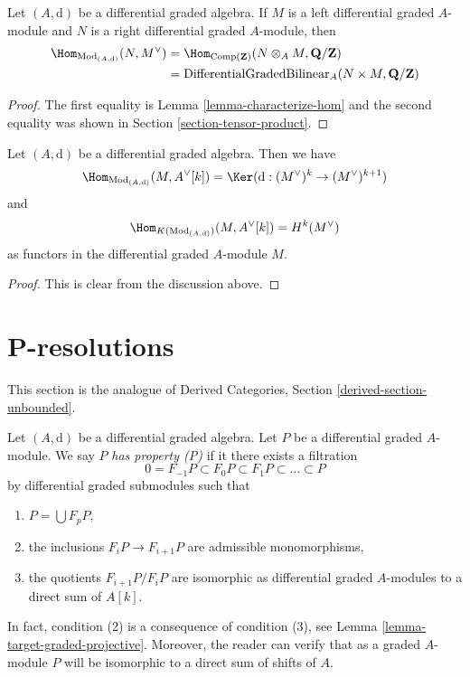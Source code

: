 \begin{lemma}
\label{lemma-map-into-dual}
Let $(A, \text{d})$ be a differential graded algebra. If
$M$ is a left differential graded $A$-module and $N$ is a
right differential graded $A$-module, then
\begin{align*}
\Hom_{\text{Mod}_{(A, \text{d})}}(N, M^\vee)
& =
\Hom_{\text{Comp}(\mathbf{Z})}(N \otimes_A M, \mathbf{Q}/\mathbf{Z}) \\
& =
\text{DifferentialGradedBilinear}_A(N \times M, \mathbf{Q}/\mathbf{Z})
\end{align*}
\end{lemma}

\begin{proof}
The first equality is Lemma \ref{lemma-characterize-hom}
and the second equality was shown in Section \ref{section-tensor-product}.
\end{proof}

\begin{lemma}
\label{lemma-hom-into-shift-dual-free}
Let $(A, \text{d})$ be a differential graded algebra. Then we have
$$
\Hom_{\text{Mod}_{(A, \text{d})}}(M, A^\vee[k]) =
\Ker(\text{d} : (M^\vee)^k \to (M^\vee)^{k + 1})
$$
and
$$
\Hom_{K(\text{Mod}_{(A, \text{d})})}(M, A^\vee[k]) = H^k(M^\vee)
$$
as functors in the differential graded $A$-module $M$.
\end{lemma}

\begin{proof}
This is clear from the discussion above.
\end{proof}















\section{P-resolutions}
\label{section-P-resolutions}

\noindent
This section is the analogue of
Derived Categories, Section \ref{derived-section-unbounded}.

\medskip\noindent
Let $(A, \text{d})$ be a differential graded algebra.
Let $P$ be a differential graded $A$-module. We say $P$
{\it has property (P)} if it there exists a filtration
$$
0 = F_{-1}P \subset F_0P \subset F_1P \subset \ldots \subset P
$$
by differential graded submodules such that
\begin{enumerate}
\item $P = \bigcup F_pP$,
\item the inclusions $F_iP \to F_{i + 1}P$ are admissible
monomorphisms,
\item the quotients $F_{i + 1}P/F_iP$ are isomorphic as differential
graded $A$-modules to a direct sum of $A[k]$.
\end{enumerate}
In fact, condition (2) is a consequence of condition (3), see
Lemma \ref{lemma-target-graded-projective}. Moreover, the reader
can verify that as a graded $A$-module $P$ will be isomorphic to a
direct sum of shifts of $A$.

